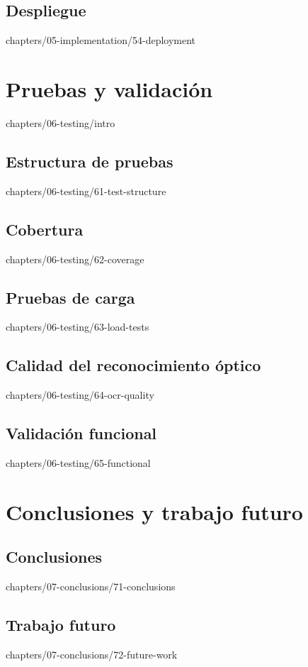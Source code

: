 \documentclass[epsbased,tfg,covers,final,printable,extendedindex,%
               firstnumbered,lof,lot, loc]{tfgtfmthesisuam}
\begin{document}
  \section{Despliegue\label{SEC:IMPL-DEPLOYMENT}}%
          {chapters/05-implementation/54-deployment}
\chapter{Pruebas y validación\label{CAP:TESTING}}%
        {chapters/06-testing/intro}
  \section{Estructura de pruebas\label{SEC:TEST-STRUCTURE}}%
          {chapters/06-testing/61-test-structure}
  \section{Cobertura\label{SEC:TEST-COVERAGE}}%
          {chapters/06-testing/62-coverage}
  \section{Pruebas de carga\label{SEC:TEST-LOAD}}%
          {chapters/06-testing/63-load-tests}
  \section[Calidad del reconocimiento óptico]%
          {Calidad del reconocimiento
           óptico\label{SEC:TEST-OCR-QUALITY}}%
          {chapters/06-testing/64-ocr-quality}
  \section{Validación funcional\label{SEC:TEST-FUNCTIONAL}}%
          {chapters/06-testing/65-functional}
\chapter{Conclusiones y trabajo futuro\label{CAP:CONCLUSIONS}}
  \section{Conclusiones\label{SEC:CONCL-CONCLUSIONS}}%
          {chapters/07-conclusions/71-conclusions}
  \section{Trabajo futuro\label{SEC:CONCL-FUTURE-WORK}}%
          {chapters/07-conclusions/72-future-work}
\end{document}
